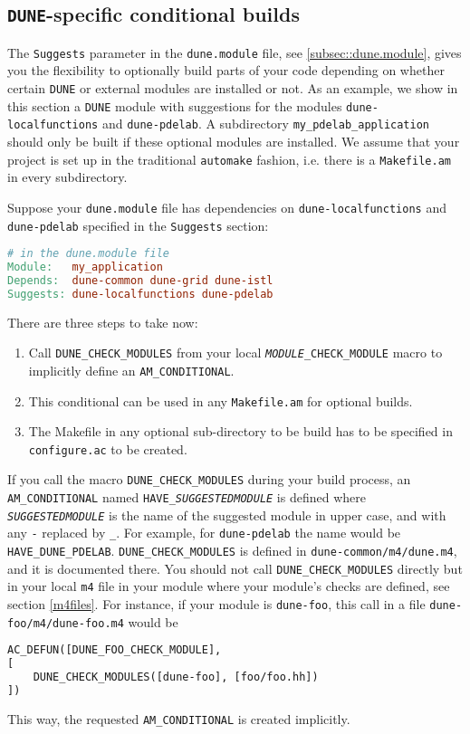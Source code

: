 \documentclass[11pt,a4paper,headinclude,footinclude,DIV16,normalheadings]{scrartcl}
\newcommand{\dune}{\texttt{DUNE}\xspace}
\begin{document}
\subsection{\dune-specific conditional builds}

The \texttt{Suggests} parameter in the \texttt{dune.module} file,
see \ref{subsec::dune.module}, gives you the flexibility to optionally build
parts of your code depending on whether certain \dune or external modules are
installed or not. As an example, we show in this section a \dune module with suggestions
for the modules \texttt{dune-localfunctions} and \texttt{dune-pdelab}.
A subdirectory \texttt{my\_pdelab\_application} should only be built if these optional modules
are installed. We assume that your project is set up in the traditional
\texttt{automake} fashion, i.e. there is a \texttt{Makefile.am} in every subdirectory.

Suppose your \texttt{dune.module} file has dependencies on \texttt{dune-localfunctions}
and \texttt{dune-pdelab} specified in the \texttt{Suggests} section:
\begin{lstlisting}[language=make]
# in the dune.module file
Module:   my_application
Depends:  dune-common dune-grid dune-istl
Suggests: dune-localfunctions dune-pdelab
\end{lstlisting}
There are three steps to take now:
\begin{enumerate}
  \item Call \texttt{DUNE\_CHECK\_MODULES} from your local \texttt{\textit{MODULE}\_CHECK\_MODULE}
    macro to implicitly define an \texttt{AM\_CONDITIONAL}.
  \item This conditional can be used in any \texttt{Makefile.am} for optional builds.
  \item The Makefile in any optional sub-directory to be build has to be
    specified in \texttt{configure.ac} to be created.
\end{enumerate}

If you call the macro \texttt{DUNE\_CHECK\_MODULES} during your build process, 
an \texttt{AM\_CONDITIONAL} named \texttt{HAVE\_\textit{SUGGESTEDMODULE}} is defined where
\texttt{\textit{SUGGESTEDMODULE}} is the name of the suggested module in upper case, and
with any \texttt{-} replaced by \texttt{\_}. For example, for \texttt{dune-pdelab} the
name would be \texttt{HAVE\_DUNE\_PDELAB}. \texttt{DUNE\_CHECK\_MODULES}
is defined in \texttt{dune-common/m4/dune.m4}, and it is documented there.
You should not call \texttt{DUNE\_CHECK\_MODULES} directly but in your local
\texttt{m4} file in your module where your module's checks are defined,
see section \ref{m4files}. For instance, if your module is \texttt{dune-foo},
this call in a file \texttt{dune-foo/m4/dune-foo.m4} would be
\begin{lstlisting}[language=make]
AC_DEFUN([DUNE_FOO_CHECK_MODULE],
[
    DUNE_CHECK_MODULES([dune-foo], [foo/foo.hh])
])
\end{lstlisting}
This way, the requested \texttt{AM\_CONDITIONAL} is created implicitly.
\end{document}
